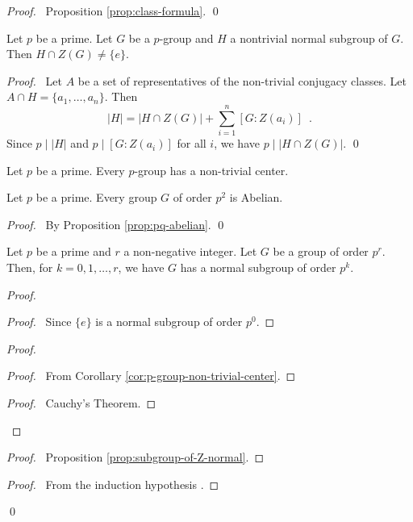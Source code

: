 \begin{proof}
\pf\ Proposition \ref{prop:class-formula}. \qed
\end{proof}

\begin{cor}
Let $p$ be a prime. Let $G$ be a $p$-group and $H$ a nontrivial normal subgroup of $G$. Then $H \cap Z(G) \neq \{e\}$.
\end{cor}

\begin{proof}
\pf\ Let $A$ be a set of representatives of the non-trivial conjugacy classes. Let $A \cap H = \{a_1, \ldots, a_n\}$. Then
\[ |H| = |H \cap Z(G)| + \sum_{i=1}^n [G : Z(a_i)] \enspace . \]
Since $p \mid |H|$ and $p \mid [G : Z(a_i)]$ for all $i$, we have $p \mid |H \cap Z(G)|$. \qed
\end{proof}

\begin{cor}
\label{cor:p-group-non-trivial-center}
Let $p$ be a prime.
Every $p$-group has a non-trivial center.
\end{cor}

\begin{cor}
Let $p$ be a prime. Every group $G$ of order $p^2$ is Abelian.
\end{cor}

\begin{proof}
\pf\ By Proposition \ref{prop:pq-abelian}. \qed
\end{proof}

\begin{prop}
Let $p$ be a prime and $r$ a non-negative integer. Let $G$ be a group of order $p^r$. Then, for $k = 0, 1, \ldots, r$, we have $G$ has a normal subgroup of order $p^k$.
\end{prop}

\begin{proof}
\pf
{}
\begin{proof}
	\pf\ Since $\{e\}$ is a normal subgroup of order $p^0$.
\end{proof}
\begin{proof}
	\begin{proof}
		\pf\ From Corollary \ref{cor:p-group-non-trivial-center}.
	\end{proof}
	\begin{proof}
		\pf\ Cauchy's Theorem.
	\end{proof}
\end{proof}
\begin{proof}
	\pf\ Proposition \ref{prop:subgroup-of-Z-normal}.
\end{proof}
\begin{proof}
	\pf\ From the induction hypothesis .
\end{proof}
\qed
\end{proof}


